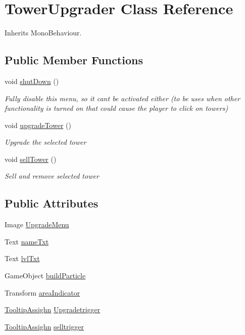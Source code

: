 \hypertarget{class_tower_upgrader}{}\section{Tower\+Upgrader Class Reference}
\label{class_tower_upgrader}


Inherits Mono\+Behaviour.

\subsection*{Public Member Functions}
\begin{DoxyCompactItemize}
\item 
void \hyperlink{class_tower_upgrader_a9f279bf18b49cd7c379fad683d4a812f}{shut\+Down} ()
\begin{DoxyCompactList}\small\item\em Fully disable this menu, so it cant be activated either (to be uses when other functionality is turned on that could cause the player to click on towers) \end{DoxyCompactList}\item 
void \hyperlink{class_tower_upgrader_a92cd2c1b5268b328b54e9bc69ade4066}{upgrade\+Tower} ()
\begin{DoxyCompactList}\small\item\em Upgrade the selected tower \end{DoxyCompactList}\item 
void \hyperlink{class_tower_upgrader_ae96a6176efeccc023018e14206264d8c}{sell\+Tower} ()
\begin{DoxyCompactList}\small\item\em Sell and remove selected tower \end{DoxyCompactList}\end{DoxyCompactItemize}
\subsection*{Public Attributes}
\begin{DoxyCompactItemize}
\item 
Image \hyperlink{class_tower_upgrader_ad79ad8068850b5c494dd6e4a76a53932}{Upgrade\+Menu}
\item 
Text \hyperlink{class_tower_upgrader_adc57841b322ae11a9e4be653b5e9ea58}{name\+Txt}
\item 
Text \hyperlink{class_tower_upgrader_a9001d72ef7a9c15331372f498ddd8261}{lvl\+Txt}
\item 
Game\+Object \hyperlink{class_tower_upgrader_aaa8c4af8401488277f1e03ed8415b482}{build\+Particle}
\item 
Transform \hyperlink{class_tower_upgrader_a464c95a14d880293e19ba905e07ceeaa}{area\+Indicator}
\item 
\hyperlink{class_tooltip_assighn}{Tooltip\+Assighn} \hyperlink{class_tower_upgrader_aa743a1544eb92eeea8e25fd7a609e0f9}{Upgradetrigger}
\item 
\hyperlink{class_tooltip_assighn}{Tooltip\+Assighn} \hyperlink{class_tower_upgrader_adb4b4a44efdd343c03735badc9aa8917}{selltrigger}
\end{DoxyCompactItemize}


